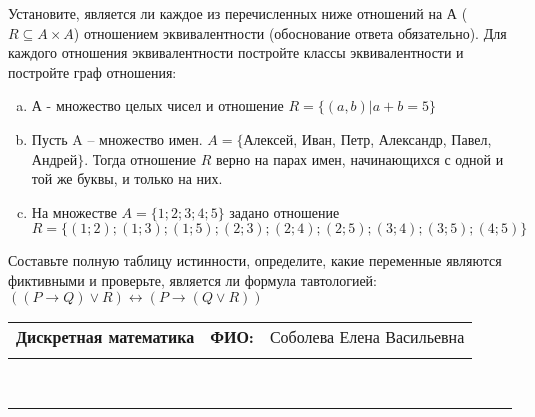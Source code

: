 \documentclass[10pt]{exam}
\newcommand{\class}{Дискретная математика}
\newcommand{\examdate}{}
\begin{document}
\begin{questions}
\question
Установите, является ли каждое из перечисленных ниже отношений на А ($R \subseteq A \times A$) отношением эквивалентности (обоснование ответа обязательно). Для каждого отношения эквивалентности постройте классы 
эквивалентности и постройте граф отношения:
\begin{enumerate} [a)]\setcounter{enumi}{0}
\item А - множество целых чисел и отношение $R = \{(a,b)|a + b = 5\}$
\item Пусть A – множество имен. $A = \{ $Алексей, Иван, Петр, Александр, Павел, Андрей$ \}$. Тогда отношение $R $ верно на парах имен, начинающихся с одной и той же буквы, и только на них.
\item На множестве $A = \{1; 2; 3; 4; 5\}$ задано отношение $R = \{(1; 2); (1; 3); (1; 5); (2; 3); (2; 4); (2; 5); (3; 4); (3; 5); (4; 5)\}$
\end{enumerate}\question Составьте полную таблицу истинности, определите, какие переменные являются фиктивными и проверьте, является ли формула тавтологией:
$((P \rightarrow Q) \lor R) \leftrightarrow (P \rightarrow (Q \lor R))$

\end{questions}
\newpage
\begin{flushright}
\begin{tabular}{p{2.8in} r l}
\textbf{\class} & \textbf{ФИО:} &Соболева Елена Васильевна
\\

\textbf{\examdate} &&\\
\end{tabular}\\
\end{flushright}
\rule[1ex]{\textwidth}{.1pt}
\end{document}
